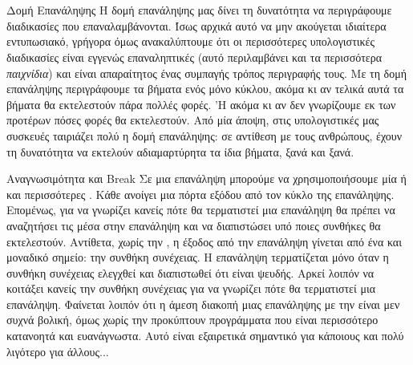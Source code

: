\documentclass[a4paper,11pt,oneside]{book}
\begin{document}

\section*{}
\vspace{-6\parskip}
\hrulefill



\begin{theory}{Δομή Επανάληψης}
Η δομή επανάληψης μας δίνει τη δυνατότητα να περιγράφουμε διαδικασίες που επαναλαμβάνονται. Ίσως αρχικά αυτό να μην ακούγεται ιδιαίτερα εντυπωσιακό, γρήγορα όμως ανακαλύπτουμε ότι οι περισσότερες υπολογιστικές διαδικασίες είναι εγγενώς επαναληπτικές (αυτό περιλαμβάνει και τα περισσότερα \emph{παιχνίδια}) και είναι απαραίτητος ένας συμπαγής τρόπος περιγραφής τους. Με τη δομή επανάληψης περιγράφουμε τα βήματα ενός μόνο κύκλου, ακόμα κι αν τελικά αυτά τα βήματα θα εκτελεστούν πάρα πολλές φορές. 'Η ακόμα κι αν δεν γνωρίζουμε εκ των προτέρων πόσες φορές θα εκτελεστούν. Από μία άποψη, στις υπολογιστικές μας συσκευές ταιριάζει πολύ η δομή επανάληψης: σε αντίθεση με τους ανθρώπους, έχουν τη δυνατότητα να εκτελούν αδιαμαρτύρητα τα ίδια βήματα, ξανά και ξανά.
\end{theory}

\begin{theory}{Αναγνωσιμότητα και Break}
Σε μια επανάληψη μπορούμε να χρησιμοποιήσουμε μία ή και περισσότερες . Κάθε  ανοίγει μια πόρτα εξόδου από τον κύκλο της επανάληψης. Επομένως, για να γνωρίζει κανείς πότε θα τερματιστεί μια επανάληψη θα πρέπει να αναζητήσει τις  μέσα στην επανάληψη και να διαπιστώσει υπό ποιες συνθήκες θα εκτελεστούν. Αντίθετα, χωρίς την , η έξοδος από την επανάληψη γίνεται από ένα και μοναδικό σημείο: την συνθήκη συνέχειας. Η επανάληψη τερματίζεται μόνο όταν η συνθήκη συνέχειας ελεγχθεί και διαπιστωθεί ότι είναι ψευδής. Αρκεί λοιπόν να κοιτάξει κανείς την συνθήκη συνέχειας για να γνωρίζει πότε θα τερματιστεί μια επανάληψη. Φαίνεται λοιπόν ότι η άμεση διακοπή μιας επανάληψης με την  είναι μεν συχνά βολική, όμως χωρίς την  προκύπτουν προγράμματα που είναι περισσότερο κατανοητά και ευανάγνωστα. Αυτό είναι εξαιρετικά σημαντικό για κάποιους και πολύ λιγότερο για άλλους...
\end{theory}
\end{document}
